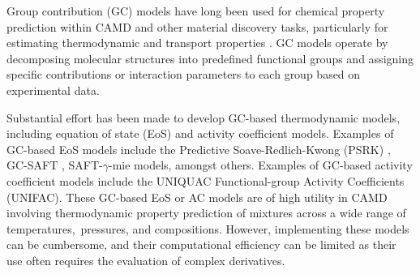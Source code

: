 \documentclass[journal=jacsat,manuscript=article, ]{achemso}
\begin{document}
Group contribution (GC) models have long been used for chemical property prediction within CAMD and other material discovery tasks, particularly for estimating thermodynamic and transport properties \cite{gharagheiziGroupContributionModel2012, chagasCalculationInterfacialTension2021, ohExtensionGroupContribution2005, gardasGroupContributionMethods2009, ohGroupContributionModel1997}.
GC models operate by decomposing molecular structures into predefined functional groups and assigning specific contributions or interaction parameters to each group based on experimental data. 

Substantial effort has been made to develop GC-based thermodynamic models, including equation of state (EoS) and activity coefficient models.
Examples of GC-based EoS models include the Predictive Soave-Redlich-Kwong (PSRK) \cite{nasrifarSaturatedLiquidDensity1998, liPredictionGasSolubilities2001},  GC-SAFT \cite{tamouzaApplicationBinaryMixtures2005, nguyenhuynhApplicationGCSAFTEOS2008, nguyenthiApplicationGroupContribution2005}, SAFT-$\gamma$-mie \cite{dufalPredictionThermodynamicProperties2014, haslamExpandingApplicationsSAFTg2020a,
fayaz-torshiziCoarseGrainedMolecularSimulation2022,
ervikBottledSAFTWeb2016} models, amongst others. Examples of GC-based activity coefficient models include the UNIQUAC Functional-group Activity Coefficients (UNIFAC). These GC-based EoS or AC models are of high utility in CAMD involving thermodynamic property prediction of mixtures across a wide range of temperatures, pressures, and compositions. However, implementing these models can be cumbersome, and their computational efficiency can be limited as their use often requires the evaluation of complex derivatives.
\end{document}

